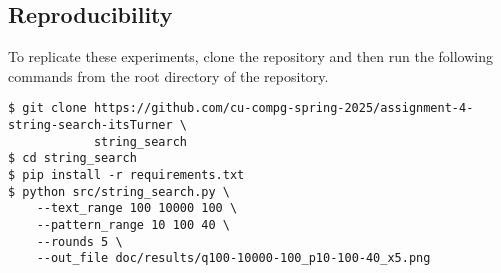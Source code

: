 \documentclass[11pt, letterpaper]{article}
\begin{document}
\subsection{Reproducibility}
To replicate these experiments, clone the repository and then run the
following commands from the root directory of the repository.
\begin{verbatim}
$ git clone https://github.com/cu-compg-spring-2025/assignment-4-string-search-itsTurner \
            string_search
$ cd string_search
$ pip install -r requirements.txt
$ python src/string_search.py \
    --text_range 100 10000 100 \
    --pattern_range 10 100 40 \
    --rounds 5 \
    --out_file doc/results/q100-10000-100_p10-100-40_x5.png
\end{verbatim}
\end{document}
